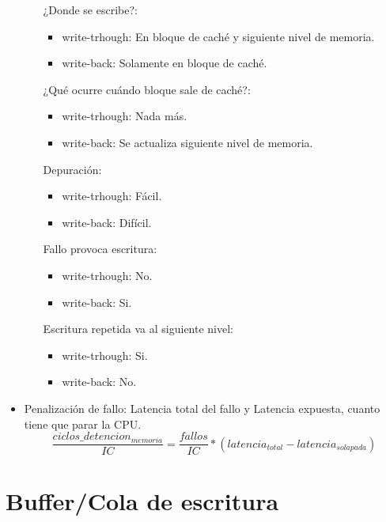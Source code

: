 \documentclass[12pt, twoside, openright]{report} %
\begin{document}
\begin{itemize}
\begin{itemize}
\begin{itemize}
		            \end{itemize}
		            ¿Donde se escribe?:
		            \begin{itemize}
			            \item write-trhough: En bloque de caché y siguiente nivel de memoria.
			            \item write-back: Solamente en bloque de caché.
		            \end{itemize}
		            ¿Qué ocurre cuándo bloque sale de caché?:
		            \begin{itemize}
			            \item write-trhough: Nada más.
			            \item write-back: Se actualiza siguiente nivel de memoria.
		            \end{itemize}
		            Depuración:
		            \begin{itemize}
			            \item write-trhough: Fácil.
			            \item write-back: Difícil.
		            \end{itemize}
		            Fallo provoca escritura:
		            \begin{itemize}
			            \item write-trhough: No.
			            \item write-back: Si.
		            \end{itemize}
		            Escritura repetida va al siguiente nivel:
		            \begin{itemize}
			            \item write-trhough: Si.
			            \item write-back: No.
		            \end{itemize}
	      \end{itemize}
	\item Penalización de fallo: Latencia total del fallo y Latencia
	      expuesta, cuanto tiene que parar la CPU.
	      $$\frac {ciclos\_detencion_{memoria}} {IC}= \frac {fallos} {IC}*(latencia_{total}-latencia_{solapada})$$
\end{itemize}
\section{Buffer/Cola de escritura}
\end{document}

